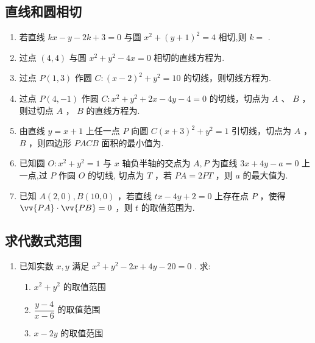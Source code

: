 \subsection*{直线和圆相切}
\begin{enumerate}
    \item 若直线 $kx - y - 2k + 3 = 0$ 与圆 $x^2 + \left( y + 1\right)^2 = 4$ 相切,则 $k =$ .
    \item 过点 $(4,4)$ 与圆 $x^2 + y^2 - 4x = 0$ 相切的直线方程为.
    \item 过点 $P(1,3)$ 作圆 $C : \left( x - 2\right)^2 + y^2 = 10$ 的切线，则切线方程为.
    \item 过点 $P(4, - 1)$ 作圆 $C : x^2 + y^2 + 2x - 4y - 4 = 0$ 的切线，切点为 $A$ 、 $B$ ，则过切点 $A$ ， $B$ 的直线方程为.
    \item 由直线 $y = x + 1$ 上任一点 $P$ 向圆 $C\left( x + 3\right)^2 + y^2 = 1$ 引切线，切点为 $A$ ， $B$ ，则四边形 $PACB$ 面积的最小值为.
    \item 已知圆 $O : x^2 + y^2 = 1$ 与 $x$ 轴负半轴的交点为 $A,P$ 为直线 $3x + 4y - a = 0$ 上一点,过 $P$ 作圆 $O$ 的切线, 切点为 $T$ ，若 $PA = 2PT$ ，则 $a$ 的最大值为.
    \item 已知 $A(2,0) ,B(10,0)$ ，若直线 $tx - 4y + 2 = 0$ 上存在点 $P$ ，使得 $\vv{PA} \cdot \vv{PB} = 0$ ，则 $t$ 的取值范围为.
\end{enumerate}
\subsection*{求代数式范围}
\begin{enumerate}
    \item 已知实数 $x,y$ 满足 $x^2 + y^2 - 2x + 4y - 20 = 0$ . 求:
    \begin{enumerate}
        \item $x^2 + y^2$ 的取值范围
        \item $\dfrac{y - 4}{x - 6}$ 的取值范围
        \item $x - 2y$ 的取值范围
    \end{enumerate}
    \begin{jieda}
    \end{jieda}
\end{enumerate}
